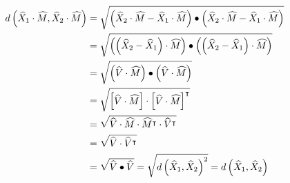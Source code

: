 \documentclass{ximera}
\begin{document}
\begin{problem}
\begin{freeResponse}
\begin{align*}
   d\left( \widehat{X}_{1}  \cdot\widehat{M},\widehat{X}_{2}
   \cdot\widehat{M}\right) &= \sqrt{\left(\widehat{X}_{2}  \cdot\widehat{M}-\widehat{X}_{1}  \cdot\widehat{M}\right) \bullet \left(\widehat{X}_{2}  	\cdot\widehat{M}-\widehat{X}_{1}  \cdot\widehat{M}\right)} \\
   & = \sqrt{\left( \left( \widehat{X}_{2}-\widehat{X}_{1} \right) \cdot\widehat{M}\right) \bullet \left( \left( \widehat{X}_{2}-\widehat{X}_{1} 		\right) \cdot\widehat{M}\right)} \\
   & = \sqrt{ \left(\widehat{V}\cdot\widehat{M} \right) \bullet \left(\widehat{V}\cdot\widehat{M} \right)}\\
   & = \sqrt{
       \begin{bmatrix}
          \widehat{V}\cdot\widehat{M}
       \end{bmatrix} \cdot
       \begin{bmatrix}
          \widehat{V}\cdot\widehat{M}
       \end{bmatrix}^\intercal}\\
   & = \sqrt{ \widehat{V}\cdot\widehat{M} \cdot \widehat{M}^\intercal \cdot \widehat{V}^\intercal} \\
   & = \sqrt{ \widehat{V} \cdot \widehat{V}^\intercal} \\
   & = \sqrt{\widehat{V} \bullet \widehat{V}} = \sqrt{d\left(  \widehat{X}_{1},\widehat{X}_{2}\right)^2} = d\left( \widehat{X}_{1},\widehat{X}_{2}\right)
\end{align*}


\end{freeResponse}
\end{problem}
\end{document}
